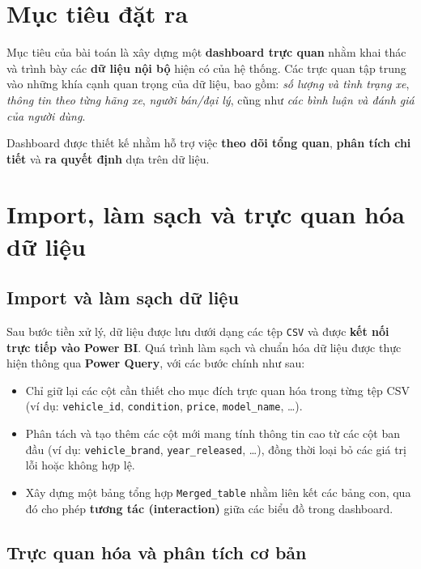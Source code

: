 
\section{Mục tiêu đặt ra}

Mục tiêu của bài toán là xây dựng một \textbf{dashboard trực quan} nhằm khai thác và trình bày các \textbf{dữ liệu nội bộ} hiện có của hệ thống. Các trực quan tập trung vào những khía cạnh quan trọng của dữ liệu, bao gồm: \textit{số lượng và tình trạng xe}, \textit{thông tin theo từng hãng xe}, \textit{người bán/đại lý}, cũng như \textit{các bình luận và đánh giá của người dùng}.  

Dashboard được thiết kế nhằm hỗ trợ việc \textbf{theo dõi tổng quan}, \textbf{phân tích chi tiết} và \textbf{ra quyết định} dựa trên dữ liệu.

\section{Import, làm sạch và trực quan hóa dữ liệu}

\subsection{Import và làm sạch dữ liệu}

Sau bước tiền xử lý, dữ liệu được lưu dưới dạng các tệp \texttt{CSV} và được \textbf{kết nối trực tiếp vào Power BI}. Quá trình làm sạch và chuẩn hóa dữ liệu được thực hiện thông qua \textbf{Power Query}, với các bước chính như sau:
\begin{itemize}
    \item Chỉ giữ lại các cột cần thiết cho mục đích trực quan hóa trong từng tệp CSV (ví dụ: \texttt{vehicle\_id}, \texttt{condition}, \texttt{price}, \texttt{model\_name}, \ldots).
    \item Phân tách và tạo thêm các cột mới mang tính thông tin cao từ các cột ban đầu (ví dụ: \texttt{vehicle\_brand}, \texttt{year\_released}, \ldots), đồng thời loại bỏ các giá trị lỗi hoặc không hợp lệ.
    \item Xây dựng một bảng tổng hợp \texttt{Merged\_table} nhằm liên kết các bảng con, qua đó cho phép \textbf{tương tác (interaction)} giữa các biểu đồ trong dashboard.
\end{itemize}

\subsection{Trực quan hóa và phân tích cơ bản}

